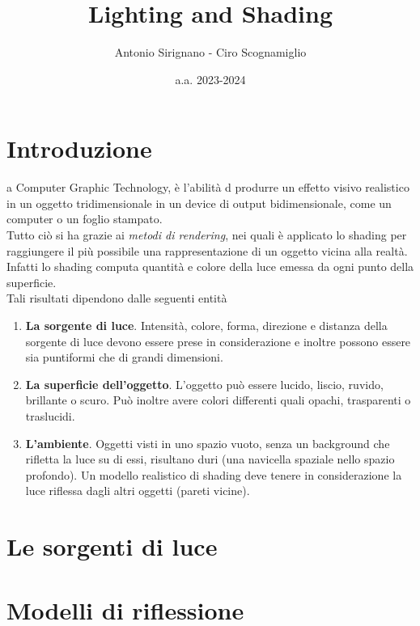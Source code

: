 \documentclass[9pt,a4paper,twoside]{tau}
\title{Lighting and Shading}
\author{Antonio Sirignano - Ciro Scognamiglio}
\date{a.a. 2023-2024}
\begin{document}
		
	\maketitle
	\thispagestyle{firststyle}
	\tauabstract
	\tableofcontents


\section{Introduzione}

    a Computer Graphic Technology, è l'abilità d produrre un effetto visivo realistico in un oggetto tridimensionale in un device di output bidimensionale, come un computer o un foglio stampato.\\
    Tutto ciò si ha grazie ai \textit{metodi di rendering}, nei quali è applicato lo shading per raggiungere il più possibile una rappresentazione di un oggetto vicina alla realtà.\\ 
    Infatti lo shading computa quantità e colore della luce emessa da ogni punto della superficie.\\
    Tali risultati dipendono dalle seguenti entità
    \begin{enumerate}
    	\item \textbf{La sorgente di luce}. Intensità, colore, forma, direzione e distanza della sorgente di luce devono essere prese in considerazione e inoltre possono essere sia puntiformi che di grandi dimensioni.
    	\item \textbf{La superficie dell'oggetto}. L'oggetto può essere lucido, liscio, ruvido, brillante o scuro. Può inoltre avere colori differenti quali opachi, trasparenti o traslucidi. 
    	\item \textbf{L'ambiente}. Oggetti visti in uno spazio vuoto, senza un background che rifletta la luce su di essi, risultano duri (una navicella spaziale nello spazio profondo). Un modello realistico di shading deve tenere in considerazione la luce riflessa dagli altri oggetti (pareti vicine).
    \end{enumerate}

\section{Le sorgenti di luce}
\section{Modelli di riflessione}
    
\end{document}
